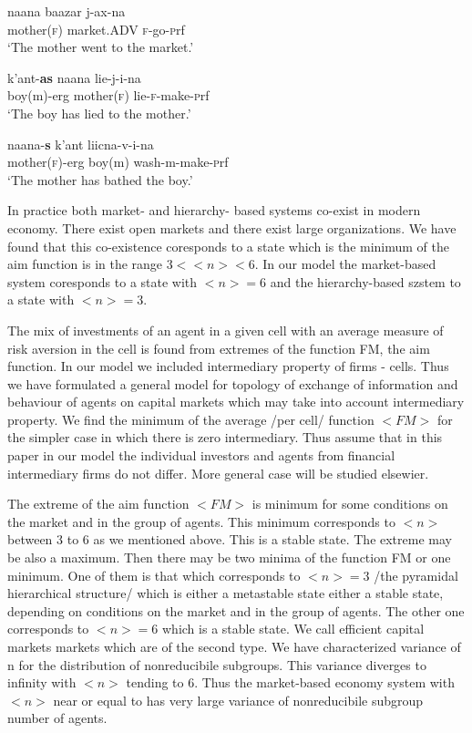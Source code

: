 \documentclass[10pt]{article}
\newcommand{\erg}{{\sc erg}}
\newcommand{\fem}{{\textsc f}}
\newcommand{\mas}{{\sc m}}
\newcommand{\prf}{{\textsc prf}}
\begin{document}


\begin{exe}\ex\label{Chechen} %
\begin{xlist}\ex\label{ChechenS}\gll naana baazar j-ax-na\\
mother(\fem{}) market.ADV \fem{}-go-\prf{}\\
\glt `The mother went to the market.'

\ex\gll k'ant-\textbf{as} naana lie-j-i-na\\
boy(\mas{})-{\erg{}} mother(\fem{}) lie-\fem{}-make-\prf{}\\
\glt `The boy has lied to the mother.'

\ex\gll naana-\textbf{s} k'ant liicna-v-i-na\\
mother(\fem{})-{\erg{}} boy(\mas{}) wash-\mas{}-make-\prf{}\\
\glt `The mother has bathed the boy.'
\end{xlist}
  \end{exe}




In practice both market- and hierarchy- based systems co-exist in modern economy. There exist open markets and there exist large organizations.
We have found that this co-existence coresponds to a state which is the minimum of the aim function is in the range $ 3 < <n> <6$. In our model the market-based system coresponds to a state with $<n> = 6$ and the hierarchy-based szstem to a state with $<n> = 3$.

The mix of investments of an agent in a given cell with an average measure of risk aversion in the cell is found from
extremes of the function FM, the aim function. In our model we included intermediary property of firms - cells. Thus we have formulated a general model for topology of exchange of information and behaviour of agents on capital markets which may take into account intermediary property. We find the minimum of the average  /per cell/ function $<FM>$ for the simpler case in which there is zero intermediary. Thus assume that in this paper in our model the individual investors and agents from financial intermediary firms do not differ. More general case will be studied elsewier.

The extreme of the aim function $<FM>$ is minimum for some conditions on the market and in the group of agents. This minimum corresponds to $<n>$ between 3 to 6 as we mentioned above.
This is a stable state. The extreme may be also a maximum. Then there may be two minima of the function FM or one minimum. One of them is that which corresponds to $<n> = 3$ /the pyramidal hierarchical structure/ which is either a metastable state either a stable state,
depending on conditions on the market and in the group of agents.
 The other one corresponds to $<n> = 6$  which is a stable state. We call efficient capital markets markets which are of the second type. We have characterized variance of n for the distribution of nonreducibile subgroups. This variance diverges to infinity with $<n>$ tending to 6. Thus the market-based economy system with $ <n> $ near 
   or equal to has very large variance of nonreducibile subgroup number of agents.
   
\end{document}
